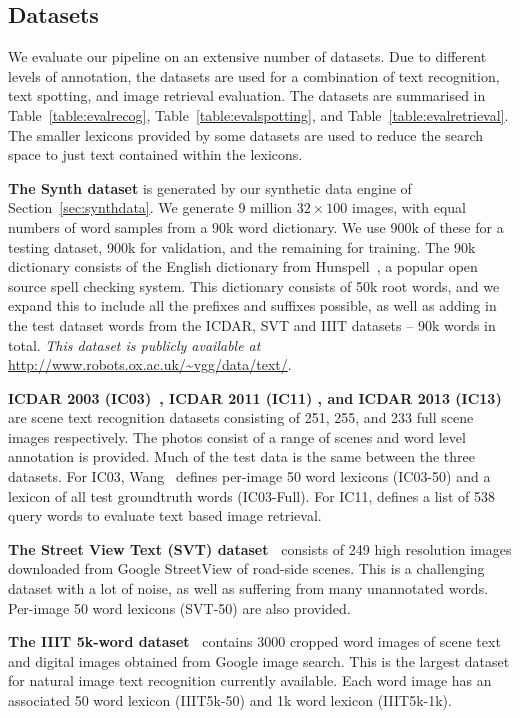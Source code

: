 \documentclass[twocolumn]{svjour3}          \smartqed  \usepackage{epsfig}
\begin{document}
\subsection{Datasets}
\label{sec:datasets}
We evaluate our pipeline on an extensive number of datasets. Due to different levels of annotation, the datasets are used for a combination of text recognition, text spotting, and image retrieval evaluation. The datasets are summarised in Table~\ref{table:evalrecog}, Table~\ref{table:evalspotting}, and Table~\ref{table:evalretrieval}. The smaller lexicons provided by some datasets are used to reduce the search space to just text contained within the lexicons.

{\bf The Synth dataset}
 is generated by our synthetic data engine of Section~\ref{sec:synthdata}. We generate 9 million $32 \times 100$ images, with equal numbers of word samples from a 90k word dictionary. We use 900k of these for a testing dataset, 900k for validation, and the remaining for training. The 90k dictionary consists of the English dictionary from Hunspell~\cite{hunspell}, a popular open source spell checking system. This dictionary consists of 50k root words, and we expand this to include all the prefixes and suffixes possible, as well as adding in the test dataset words from the ICDAR, SVT and IIIT datasets -- 90k words in total. \emph{This dataset is publicly available at } \url{http://www.robots.ox.ac.uk/~vgg/data/text/}.

{\bf ICDAR 2003 (IC03)~\cite{icdar2003dataset}, ICDAR 2011 (IC11) \cite{ICDAR11}, and ICDAR 2013 (IC13)~\cite{ICDAR2013}}
are scene text recognition datasets consisting of 251, 255, and 233 full scene images respectively. The photos consist of a range of scenes and word level annotation is provided. Much of the test data is the same between the three datasets. For IC03, Wang~\cite{Wang11} defines per-image 50 word lexicons (IC03-50) and a lexicon of all test groundtruth words (IC03-Full). For IC11, \cite{Mishra13} defines a list of 538 query words to evaluate text based image retrieval.

{\bf The Street View Text (SVT) dataset~\cite{Wang11}}
consists of 249 high resolution images downloaded from Google StreetView of road-side scenes. This is a challenging dataset with a lot of noise, as well as suffering from many unannotated words. Per-image 50 word lexicons (SVT-50) are also provided.

{\bf The IIIT 5k-word dataset~\cite{Mishra12}}
contains 3000 cropped word images of scene text and digital images obtained from Google image search. This is the largest dataset for natural image text recognition currently available. Each word image has an associated 50 word lexicon (IIIT5k-50) and 1k word lexicon (IIIT5k-1k).
\end{document}
